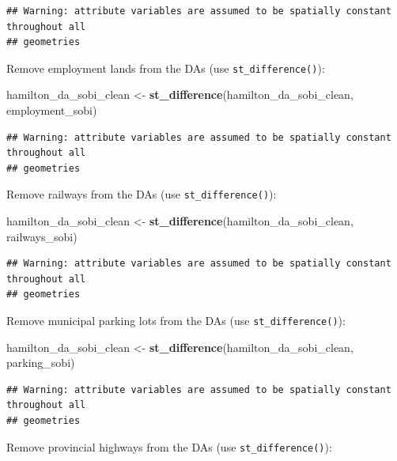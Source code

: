 \documentclass[
]{article}
\newenvironment{Shaded}{\begin{snugshade}}{\end{snugshade}}
\newcommand{\KeywordTok}[1]{\textcolor[rgb]{0.13,0.29,0.53}{\textbf{#1}}}
\newcommand{\NormalTok}[1]{#1}
\newcommand{\StringTok}[1]{\textcolor[rgb]{0.31,0.60,0.02}{#1}}
\begin{document}
\begin{verbatim}
## Warning: attribute variables are assumed to be spatially constant throughout all
## geometries
\end{verbatim}

Remove employment lands from the DAs (use \texttt{st\_difference()}):

\begin{Shaded}
\begin{Highlighting}[]
\NormalTok{hamilton_da_sobi_clean <-}\StringTok{ }\KeywordTok{st_difference}\NormalTok{(hamilton_da_sobi_clean, employment_sobi)}
\end{Highlighting}
\end{Shaded}

\begin{verbatim}
## Warning: attribute variables are assumed to be spatially constant throughout all
## geometries
\end{verbatim}

Remove railways from the DAs (use \texttt{st\_difference()}):

\begin{Shaded}
\begin{Highlighting}[]
\NormalTok{hamilton_da_sobi_clean <-}\StringTok{ }\KeywordTok{st_difference}\NormalTok{(hamilton_da_sobi_clean, railways_sobi)}
\end{Highlighting}
\end{Shaded}

\begin{verbatim}
## Warning: attribute variables are assumed to be spatially constant throughout all
## geometries
\end{verbatim}

Remove municipal parking lots from the DAs (use
\texttt{st\_difference()}):

\begin{Shaded}
\begin{Highlighting}[]
\NormalTok{hamilton_da_sobi_clean <-}\StringTok{ }\KeywordTok{st_difference}\NormalTok{(hamilton_da_sobi_clean, parking_sobi)}
\end{Highlighting}
\end{Shaded}

\begin{verbatim}
## Warning: attribute variables are assumed to be spatially constant throughout all
## geometries
\end{verbatim}

Remove provincial highways from the DAs (use \texttt{st\_difference()}):
\end{document}
